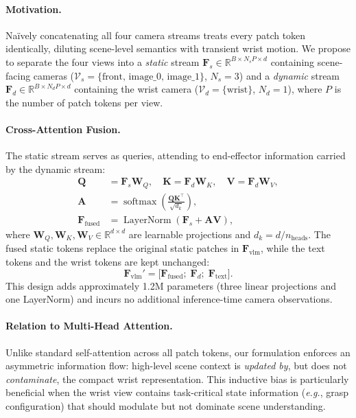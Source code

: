 \documentclass[10pt,twocolumn]{article}
\newcommand{\eg}{\textit{e.g.}}
\newcommand{\Fvlm}{\mathbf{F}_{\mathrm{vlm}}}
\newcommand{\Fs}{\mathbf{F}_s}
\newcommand{\Fd}{\mathbf{F}_d}
\newcommand{\Ffused}{\mathbf{F}_{\mathrm{fused}}}
\begin{document}
\paragraph{Motivation.}
Naïvely concatenating all four camera streams treats every patch token
identically, diluting scene-level semantics with transient wrist motion.
We propose to separate the four views into a \emph{static} stream
$\Fs \in \mathbb{R}^{B \times N_s P \times d}$
containing scene-facing cameras
($\mathcal{V}_s = \{\text{front, image\_0, image\_1}\}$, $N_s{=}3$)
and a \emph{dynamic} stream
$\Fd \in \mathbb{R}^{B \times N_d P \times d}$
containing the wrist camera
($\mathcal{V}_d = \{\text{wrist}\}$, $N_d{=}1$),
where $P$ is the number of patch tokens per view.

\paragraph{Cross-Attention Fusion.}
The static stream serves as queries, attending to end-effector information
carried by the dynamic stream:
\begin{align}
  \mathbf{Q} &= \Fs \mathbf{W}_Q,\quad
  \mathbf{K} = \Fd \mathbf{W}_K,\quad
  \mathbf{V} = \Fd \mathbf{W}_V,
  \label{eq:ds_qkv}\\
  \mathbf{A} &= \operatorname{softmax}\!\left(
    \frac{\mathbf{Q}\mathbf{K}^\top}{\sqrt{d_k}}\right),
  \label{eq:ds_attn}\\
  \Ffused &= \operatorname{LayerNorm}\!\left(\Fs + \mathbf{A}\mathbf{V}\right),
  \label{eq:ds_fused}
\end{align}
where $\mathbf{W}_Q, \mathbf{W}_K, \mathbf{W}_V \in \mathbb{R}^{d \times d}$
are learnable projections and $d_k = d / n_{\mathrm{heads}}$.
The fused static tokens replace the original static patches in $\Fvlm$,
while the text tokens and the wrist tokens are kept unchanged:
\begin{equation}
  \Fvlm' = \bigl[\Ffused;\; \Fd;\; \mathbf{F}_{\mathrm{text}}\bigr].
  \label{eq:ds_out}
\end{equation}
This design adds approximately 1.2M parameters (three linear projections and
one LayerNorm) and incurs no additional inference-time camera observations.

\paragraph{Relation to Multi-Head Attention.}
Unlike standard self-attention across all patch tokens, our formulation
enforces an asymmetric information flow: high-level scene context is
\emph{updated by}, but does not \emph{contaminate}, the compact wrist
representation. This inductive bias is particularly beneficial when the wrist
view contains task-critical state information (\eg, grasp configuration)
that should modulate but not dominate scene understanding.
\end{document}
